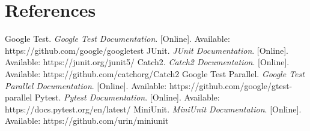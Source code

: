 \documentclass{article}
\begin{document}
\section{References}
\begin{thebibliography}{99}
     Google Test. \textit{Google Test Documentation}. [Online]. Available: https://github.com/google/googletest
     JUnit. \textit{JUnit Documentation}. [Online]. Available: https://junit.org/junit5/
     Catch2. \textit{Catch2 Documentation}. [Online]. Available: https://github.com/catchorg/Catch2
     Google Test Parallel. \textit{Google Test Parallel Documentation}. [Online]. Available: https://github.com/google/gtest-parallel
     Pytest. \textit{Pytest Documentation}. [Online]. Available: https://docs.pytest.org/en/latest/
     MiniUnit. \textit{MiniUnit Documentation}. [Online]. Available: https://github.com/urin/miniunit
\end{thebibliography}
\end{document}

